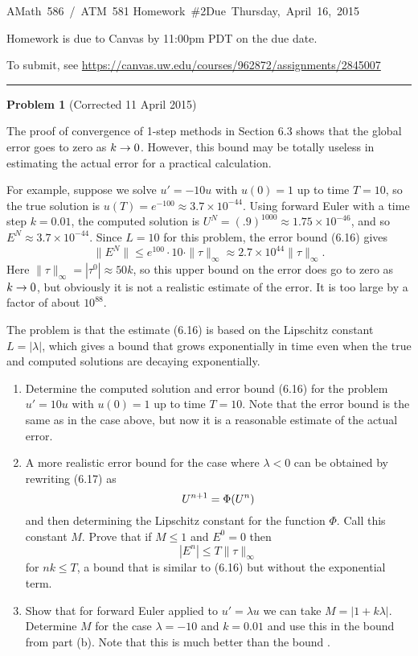 \documentclass[10pt]{article}
\begin{document}
\hfill\vbox{\hbox{AMath 586 / ATM 581}
\hbox{Homework \#2}\hbox{Due Thursday, April 16, 2015}}

\vskip 5pt

Homework is due to Canvas by 11:00pm PDT on the due date.

To submit, see \url{https://canvas.uw.edu/courses/962872/assignments/2845007}


\vskip 1cm
\hrule
{\bf Problem 1}  (Corrected 11 April 2015)


The proof of convergence of 1-step methods in Section 6.3 shows that the 
global error goes to zero as $k\rightarrow 0$.
However, this bound may be totally useless in estimating the actual error
for a practical calculation.

For example, suppose we solve $u'=-10u$ with $u(0)=1$ up to time $T=10$, so
the true solution is $u(T)=e^{-100} \approx 3.7\times 10^{-44}$.
Using forward Euler with a time step $k=0.01$,  
the computed solution is $U^N = (.9)^{1000}\approx 1.75 \times
10^{-46}$, and so $E^N \approx 3.7 \times 10^{-44}$.
Since $L=10$ for this problem, the error bound (6.16) gives
\begin{equation}\label{eq:1}
\|E^N\| \leq e^{100}\cdot 10 \cdot \|\tau \|_\infty \approx 2.7 \times
10^{44} \|\tau\|_\infty.
\end{equation} 
Here $\|\tau\|_\infty =|\tau^0| \approx 50 k$, so this upper bound on the
error does go to zero as $k\rightarrow 0$, but obviously it is not a realistic
estimate of the error. It is too large by a factor of about $10^{88}$.

The problem is that the estimate (6.16) is based on the Lipschitz
constant $L=|\lambda|$, which gives a bound that grows exponentially in time
even when the true and computed solutions are decaying exponentially.

\begin{enumerate}
\item Determine the computed solution and error bound (6.16) for the problem
$u' = 10u$ with $u(0)=1$ up to time $T=10$.  Note that the error bound is
the same as in the case above, but now it is a reasonable estimate of the
actual error.

\item A more realistic error bound for the case where $\lambda<0$ can be
obtained by rewriting (6.17) as
\[
U^{n+1} = \Phi(U^n)
\]
and then determining the Lipschitz constant for the function $\Phi$.
Call this constant $M$.  Prove that if $M\leq 1$  and $E^0=0$ then
\[
|E^n| \leq  T\|\tau\|_\infty
\]
for $nk\leq T$, a bound that is similar to (6.16) but without the
exponential term.


\item Show that for forward Euler applied to $u'=\lambda
u$ we can take $M = |1+k\lambda|$.  Determine $M$ for the case $\lambda =
-10$ and $k=0.01$ and use this in the bound from part (b).
Note that this is much better than the bound .

\end{enumerate}
\end{document}
